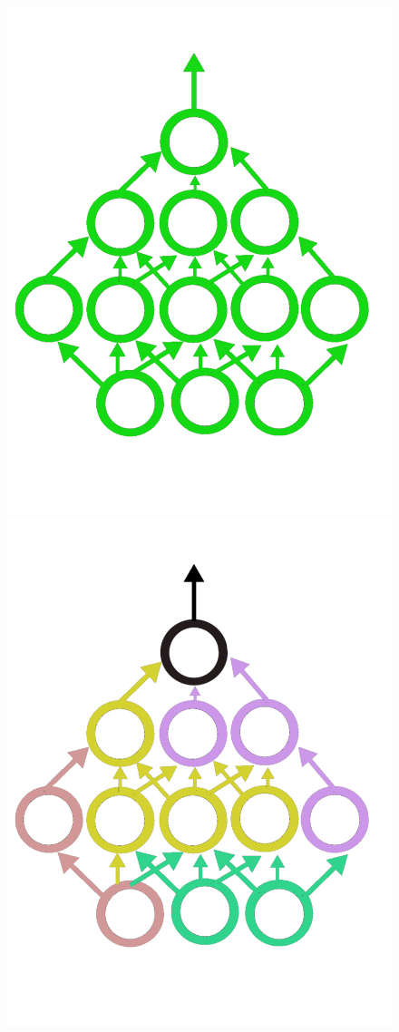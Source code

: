 \begin{figure}[!htb]
  \includegraphics[width=\linewidth]{./Images/Chapter03/fine_tuning_net.pdf}
\endminipage\hfill
{}%
  \includegraphics[width=\linewidth]{./Images/Chapter03/random_net.pdf}

\end{figure}
